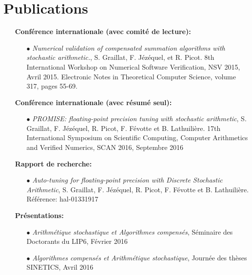 \documentclass[10pt]{article}
\begin{document}
\section{Publications}
        \begin{itemize}
               \item[] {\bf Conférence internationale (avec comité de lecture):}
                 
               \begin{itemize}
               \item[$\bullet$] \emph{Numerical validation of
                   compensated summation algorithms with stochastic
                   arithmetic.}, S. Graillat, F. Jézéquel, et
                 R. Picot.  8th International Workshop on Numerical
                 Software Verification, NSV 2015, Avril
                 2015. Electronic Notes in Theoretical Computer
                 Science, volume 317, pages 55-69.
               \end{itemize}
                 
               \item[] {\bf Conférence internationale (avec résumé seul):}
                 
               \begin{itemize}
               \item[$\bullet$] \emph{PROMISE: floating-point
                   precision tuning with stochastic arithmetic},
                 S. Graillat, F. Jézéquel, R. Picot, F. Févotte et
                 B. Lathuilière. 17th International Symposium on
                 Scientific Computing, Computer Arithmetics and
                 Verified Numerics, SCAN 2016, Septembre 2016
               \end{itemize}
                 
               \item[] {\bf Rapport de recherche:}
                 
               \begin{itemize}
               \item[$\bullet$] \emph{Auto-tuning for floating-point
                   precision with Discrete Stochastic Arithmetic},
                 S. Graillat, F. Jézéquel, R. Picot, F. Févotte et
                 B. Lathuilière. Référence: hal-01331917
               \end{itemize}
                 
               \item[] {\bf Présentations:}
                 
               \begin{itemize}
                 \item[$\bullet$] \emph{Arithmétique stochastique et Algorithmes compensés}, Séminaire des Doctorants du LIP6, Février 2016
                 \item[$\bullet$] \emph{Algorithmes compensés et Arithmétique stochastique}, Journée des thèses SINETICS, Avril 2016
               \end{itemize}
                                    
       \end{itemize}
\end{document}
